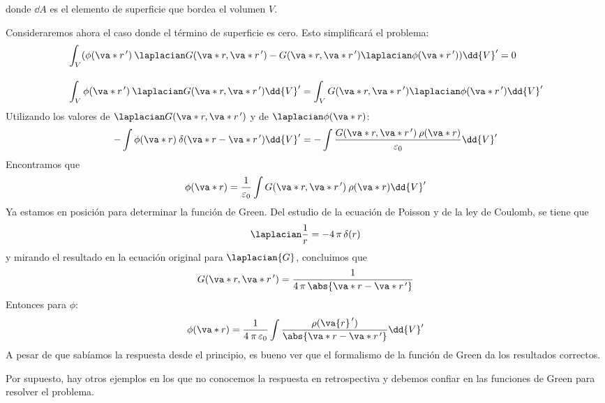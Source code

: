 donde $\dd{A}$ es el elemento de superficie que bordea el volumen $V$.
\par
Consideraremos ahora el caso donde el término de superficie es cero. Esto simplificará el problema:
\begin{align}
&\int_{V} (\phi (\va*{r}^{\, \prime}) \: \laplacian G (\va*{r}, \va*{r}^{\, \prime}) - G(\va*{r}, \va*{r}^{\, \prime}) \laplacian \phi (\va*{r}^{\, \prime})) \dd{V}^{\prime} = 0 \label{eq:ecuacion_37} \\[1em]
&\int_{V} \phi (\va*{r}^{\, \prime}) \: \laplacian G (\va*{r}, \va*{r}^{\, \prime}) \dd{V}^{\prime} = \int_{V} G(\va*{r}, \va*{r}^{\, \prime}) \laplacian \phi (\va*{r}^{\, \prime}) \dd{V}^{\prime} \label{eq:ecuacion_38}
\end{align}
Utilizando los valores de $\laplacian G (\va*{r}, \va*{r}^{\, \prime})$ y de $\laplacian \phi (\va*{r})$:
\begin{equation}
- \int \phi (\va*{r}) \: \delta (\va*{r} - \va*{r}^{\, \prime}) \dd{V}^{\prime} = - \int \dfrac{G (\va*{r}, \va*{r}^{\, \prime}) \: \rho (\va*{r})}{\varepsilon_{0}} \dd{V}^{\prime}
\label{eq:ecuacion_39}
\end{equation}
Encontramos que
\begin{equation}
\phi (\va*{r}) = \dfrac{1}{\varepsilon_{0}} \int G (\va*{r}, \va*{r}^{\, \prime}) \: \rho (\va*{r}) \dd{V}^{\prime}
\label{eq:ecuacion_40}
\end{equation}
Ya estamos en posición para determinar la función de Green. Del estudio de la ecuación de Poisson y de la ley de Coulomb, se tiene que
\begin{equation}
\laplacian \dfrac{1}{r} = - 4 \, \pi \, \delta(r)
\label{eq:ecuacion_41}
\end{equation}
y mirando el resultado en la ecuación original para $\laplacian{G}$, concluimos que
\begin{equation}
G (\va*{r}, \va*{r}^{\, \prime}) = \dfrac{1}{4 \, \pi \, \abs{\va*{r} - \va*{r}^{\, \prime}}}
\label{eq:ecuacion_42}
\end{equation}
Entonces para $\phi$:
\begin{equation}
\phi (\va*{r}) = \dfrac{1}{4 \: \pi \, \varepsilon_{0}} \int \dfrac{\rho (\va{r}^{\, \prime})}{\abs{\va*{r} - \va*{r}^{\, \prime}}} \dd{V}^{\prime}
\label{eq:ecuacion_43}
\end{equation}
A pesar de que sabíamos la respuesta desde el principio, es bueno ver que el formalismo de la función de Green da los resultados correctos. 
\par
Por supuesto, hay otros ejemplos en los que no conocemos la respuesta en retrospectiva y debemos confiar en las funciones de Green para resolver el problema.

